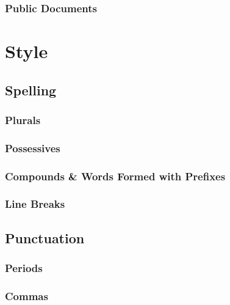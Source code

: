 \documentclass[oneside]{book}
\numberwithin{equation}{section}
\begin{document}
\section{Public Documents}


\part{Style}


\chapter{Spelling}

\section{Plurals}

\section{Possessives}

\section{Compounds \& Words Formed with Prefixes}

\section{Line Breaks}


\chapter{Punctuation}

\section{Periods}

\section{Commas}
\end{document}
